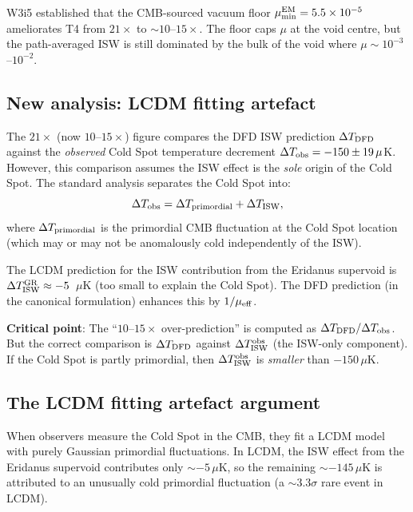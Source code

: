 \documentclass[11pt]{article}
\newcommand{\ee}[1]{\times 10^{#1}}
\newcommand{\mufd}{\mu}
\newcommand{\mumin}{\mu_{\rm min}}
\begin{document}
W3i5 established that the CMB-sourced vacuum floor $\mumin^{\rm EM}
= 5.5\ee{-5}$ ameliorates T4 from $21\times$ to $\sim 10$--$15\times$.
The floor caps $\mufd$ at the void centre, but the path-averaged ISW
is still dominated by the bulk of the void where $\mufd \sim 10^{-3}$--$10^{-2}$.

\subsection{New analysis: LCDM fitting artefact}

The $21\times$ (now $10$--$15\times$) figure compares the DFD ISW
prediction $\Delta T_{\rm DFD}$ against the \emph{observed} Cold Spot
temperature decrement $\Delta T_{\rm obs} = -150\pm 19\,\mu$K. However,
this comparison assumes the ISW effect is the \emph{sole} origin of the
Cold Spot. The standard analysis separates the Cold Spot into:
\begin{equation}
\Delta T_{\rm obs} = \Delta T_{\rm primordial} + \Delta T_{\rm ISW},
\label{eq:CS-decomp}
\end{equation}
where $\Delta T_{\rm primordial}$ is the primordial CMB fluctuation at
the Cold Spot location (which may or may not be anomalously cold
independently of the ISW).

The LCDM prediction for the ISW contribution from the Eridanus supervoid
is $\Delta T_{\rm ISW}^{\rm GR} \approx -5$~$\mu$K (too small to explain
the Cold Spot). The DFD prediction (in the canonical formulation) enhances
this by $1/\mufd_{\rm eff}$.

\textbf{Critical point}: The ``$10$--$15\times$ over-prediction'' is
computed as $\Delta T_{\rm DFD}/\Delta T_{\rm obs}$. But the correct
comparison is $\Delta T_{\rm DFD}$ against $\Delta T_{\rm ISW}^{\rm obs}$
(the ISW-only component). If the Cold Spot is partly primordial, then
$\Delta T_{\rm ISW}^{\rm obs}$ is \emph{smaller} than $-150\,\mu$K.

\subsection{The LCDM fitting artefact argument}

When observers measure the Cold Spot in the CMB, they fit a LCDM model
with purely Gaussian primordial fluctuations. In LCDM, the ISW effect
from the Eridanus supervoid contributes only $\sim -5\,\mu$K, so the
remaining $\sim -145\,\mu$K is attributed to an unusually cold primordial
fluctuation (a $\sim 3.3\sigma$ rare event in LCDM).
\end{document}
